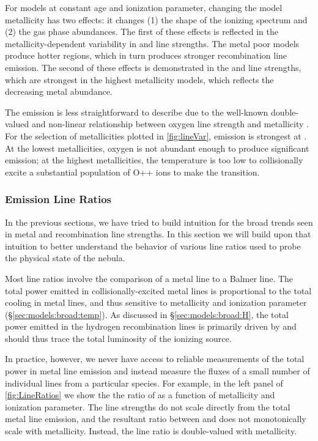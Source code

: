 For models at constant age and ionization parameter, changing the model metallicity has two effects: it changes (1) the shape of the ionizing spectrum and (2) the gas phase abundances. The first of these effects is reflected in the metallicity-dependent variability in \ha{} and \hb{} line strengths. The metal poor models produce hotter \hii regions, which in turn produces stronger recombination line emission. The second of these effects is demonstrated in the \nii{} and \sii{} line strengths, which are strongest in the highest metallicity models, which reflects the decreasing metal abundance.

The \oiii{} emission is less straightforward to describe due to the well-known double-valued and non-linear relationship between oxygen line strength and metallicity \citep{Pilyugin05, Kewley08}. For the selection of metallicities plotted in \ref{fig:lineVar}, \oiii{} emission is strongest at . At the lowest metallicities, oxygen is not abundant enough to produce significant emission; at the highest metallicities, the temperature is too low to collisionally excite a substantial population of O++ ions to make the \oiii{} transition. 

\subsubsection{Emission Line Ratios}\label{sec:models:lines:ratios}

In the previous sections, we have tried to build intuition for the broad trends seen in metal and recombination line strengths. In this section we will build upon that intuition to better understand the behavior of various line ratios used to probe the physical state of the nebula.

Most line ratios involve the comparison of a metal line to a Balmer line. The total power emitted in collisionally-excited metal lines is proportional to the total cooling in metal lines, and thus sensitive to metallicity and ionization parameter (\S\ref{sec:models:broad:temp}). As discussed in \S\ref{sec:models:broad:H}, the total power emitted in the hydrogen recombination lines is primarily driven by \QH{} and should thus trace the total luminosity of the ionizing source. 

In practice, however, we never have access to reliable measurements of the total power in metal line emission and instead measure the fluxes of a small number of individual lines from a particular species. For example, in the left panel of \ref{fig:LineRatios} we show the the ratio of \oiiihb{} as a function of metallicity and ionization parameter. The \oiii{} line strengths do not scale directly from the total metal line emission, and the resultant ratio between \oiii{} and \hb{} does not monotonically scale with metallicity. Instead, the line ratio is double-valued with metallicity.

